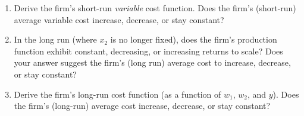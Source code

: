 \documentclass[11pt]{article}
\begin{document}
\begin{enumerate}
\begin{enumerate}
        \item Derive the firm's short-run \emph{variable} cost function. Does the firm's (short-run) average variable cost increase, decrease, or stay constant?

        \item In the long run (where $x_{2}$ is no longer fixed), does the firm's production function exhibit constant, decreasing, or increasing returns to scale? Does your answer suggest the firm's (long run) average cost to increase, decrease, or stay constant?

        \item Derive the firm's long-run cost function (as a function of $w_{1}$, $w_{2}$, and $y$). Does the firm's (long-run) average cost increase, decrease, or stay constant?
    \end{enumerate}

\end{enumerate}
\end{document}
